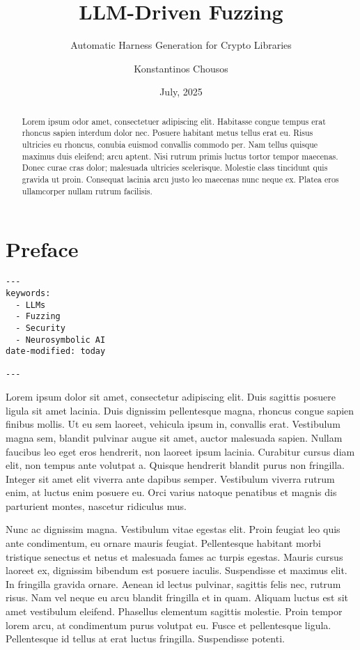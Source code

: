 \documentclass[
  a4paper,
  DIV=11,
  numbers=noendperiod]{scrreprt}
\title{LLM-Driven Fuzzing}
\subtitle{Automatic Harness Generation for Crypto Libraries}
\author{Konstantinos Chousos}
\date{July, 2025}
\begin{document}
\maketitle
\begin{abstract}
Lorem ipsum odor amet, consectetuer adipiscing elit. Habitasse congue
tempus erat rhoncus sapien interdum dolor nec. Posuere habitant metus
tellus erat eu. Risus ultricies eu rhoncus, conubia euismod convallis
commodo per. Nam tellus quisque maximus duis eleifend; arcu aptent. Nisi
rutrum primis luctus tortor tempor maecenas. Donec curae cras dolor;
malesuada ultricies scelerisque. Molestie class tincidunt quis gravida
ut proin. Consequat lacinia arcu justo leo maecenas nunc neque ex.
Platea eros ullamcorper nullam rutrum facilisis.
\end{abstract}



\chapter*{Preface}\label{preface}


\begin{verbatim}
---
keywords:
  - LLMs
  - Fuzzing
  - Security
  - Neurosymbolic AI
date-modified: today

---

\end{verbatim}

Lorem ipsum dolor sit amet, consectetur adipiscing elit. Duis sagittis
posuere ligula sit amet lacinia. Duis dignissim pellentesque magna,
rhoncus congue sapien finibus mollis. Ut eu sem laoreet, vehicula ipsum
in, convallis erat. Vestibulum magna sem, blandit pulvinar augue sit
amet, auctor malesuada sapien. Nullam faucibus leo eget eros hendrerit,
non laoreet ipsum lacinia. Curabitur cursus diam elit, non tempus ante
volutpat a. Quisque hendrerit blandit purus non fringilla. Integer sit
amet elit viverra ante dapibus semper. Vestibulum viverra rutrum enim,
at luctus enim posuere eu. Orci varius natoque penatibus et magnis dis
parturient montes, nascetur ridiculus mus.

Nunc ac dignissim magna. Vestibulum vitae egestas elit. Proin feugiat
leo quis ante condimentum, eu ornare mauris feugiat. Pellentesque
habitant morbi tristique senectus et netus et malesuada fames ac turpis
egestas. Mauris cursus laoreet ex, dignissim bibendum est posuere
iaculis. Suspendisse et maximus elit. In fringilla gravida ornare.
Aenean id lectus pulvinar, sagittis felis nec, rutrum risus. Nam vel
neque eu arcu blandit fringilla et in quam. Aliquam luctus est sit amet
vestibulum eleifend. Phasellus elementum sagittis molestie. Proin tempor
lorem arcu, at condimentum purus volutpat eu. Fusce et pellentesque
ligula. Pellentesque id tellus at erat luctus fringilla. Suspendisse
potenti.
\end{document}

